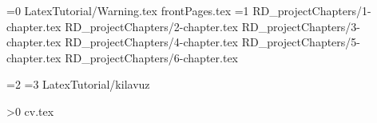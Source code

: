 \documentclass[a4paper,12pt,oneside,openany]{book}
\begin{document}
\newcommand{\projecttype}{1}
\ifnum\projecttype=0
 {LatexTutorial/Warning.tex}
\else
 {frontPages.tex}
\fi
\ifnum\projecttype=1
 {RD_projectChapters/1-chapter.tex}
 {RD_projectChapters/2-chapter.tex}
 {RD_projectChapters/3-chapter.tex}
 {RD_projectChapters/4-chapter.tex}
 {RD_projectChapters/5-chapter.tex}
 {RD_projectChapters/6-chapter.tex}

\fi
\ifnum\projecttype=2
\fi
\ifnum\projecttype=3
 {LatexTutorial/kilavuz}
\fi

\newpage\appendix


\newpage
{}
\singlespacing
\printbibliography[title={\bibName}]

\ifnum{}
\newpage
{}

\ifnum\projecttype>0
 {cv.tex}
\fi
\fi
\end{document}
